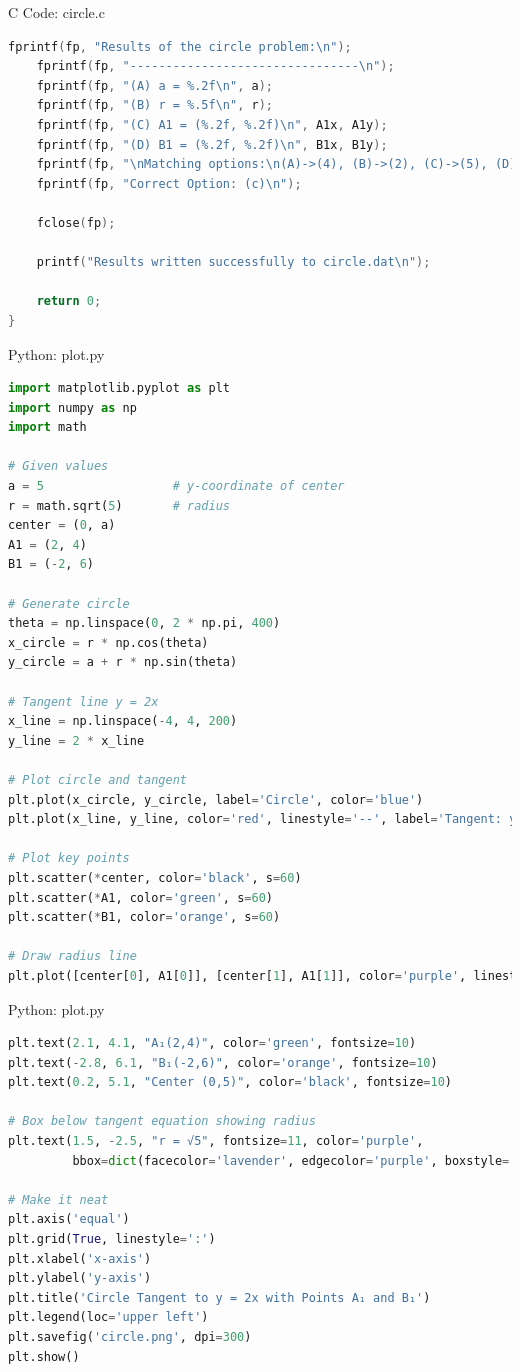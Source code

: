 \documentclass{beamer}
\numberwithin{equation}{section}
\theoremstyle{remark}
\begin{document}
\begin{frame}[fragile]{C Code: circle.c}
\begin{lstlisting}[language=C]
    fprintf(fp, "Results of the circle problem:\n");
    fprintf(fp, "--------------------------------\n");
    fprintf(fp, "(A) a = %.2f\n", a);
    fprintf(fp, "(B) r = %.5f\n", r);
    fprintf(fp, "(C) A1 = (%.2f, %.2f)\n", A1x, A1y);
    fprintf(fp, "(D) B1 = (%.2f, %.2f)\n", B1x, B1y);
    fprintf(fp, "\nMatching options:\n(A)->(4), (B)->(2), (C)->(5), (D)->(3)\n");
    fprintf(fp, "Correct Option: (c)\n");

    fclose(fp);

    printf("Results written successfully to circle.dat\n");

    return 0;
}
\end{lstlisting}
\end{frame}

\begin{frame}[fragile]{Python: plot.py}
\begin{lstlisting}[language=Python]
import matplotlib.pyplot as plt
import numpy as np
import math

# Given values
a = 5                  # y-coordinate of center
r = math.sqrt(5)       # radius
center = (0, a)
A1 = (2, 4)
B1 = (-2, 6)

# Generate circle
theta = np.linspace(0, 2 * np.pi, 400)
x_circle = r * np.cos(theta)
y_circle = a + r * np.sin(theta)

# Tangent line y = 2x
x_line = np.linspace(-4, 4, 200)
y_line = 2 * x_line

# Plot circle and tangent
plt.plot(x_circle, y_circle, label='Circle', color='blue')
plt.plot(x_line, y_line, color='red', linestyle='--', label='Tangent: y = 2x')

# Plot key points
plt.scatter(*center, color='black', s=60)
plt.scatter(*A1, color='green', s=60)
plt.scatter(*B1, color='orange', s=60)

# Draw radius line
plt.plot([center[0], A1[0]], [center[1], A1[1]], color='purple', linestyle=':')
\end{lstlisting}
\end{frame}

\begin{frame}[fragile]{Python: plot.py}
\begin{lstlisting}[language=Python]
plt.text(2.1, 4.1, "A₁(2,4)", color='green', fontsize=10)
plt.text(-2.8, 6.1, "B₁(-2,6)", color='orange', fontsize=10)
plt.text(0.2, 5.1, "Center (0,5)", color='black', fontsize=10)

# Box below tangent equation showing radius
plt.text(1.5, -2.5, "r = √5", fontsize=11, color='purple',
         bbox=dict(facecolor='lavender', edgecolor='purple', boxstyle='round,pad=0.4'))

# Make it neat
plt.axis('equal')
plt.grid(True, linestyle=':')
plt.xlabel('x-axis')
plt.ylabel('y-axis')
plt.title('Circle Tangent to y = 2x with Points A₁ and B₁')
plt.legend(loc='upper left')
plt.savefig('circle.png', dpi=300)
plt.show()

  \end{lstlisting}
\end{frame}
\end{document}
